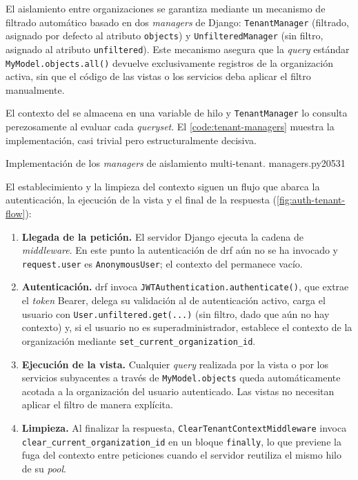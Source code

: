 El aislamiento entre organizaciones se garantiza mediante un mecanismo
de filtrado automático basado en dos \textit{managers} de Django:
\texttt{TenantManager} (filtrado, asignado por defecto al atributo
\texttt{objects}) y \texttt{UnfilteredManager} (sin filtro, asignado al
atributo \texttt{unfiltered}). Este mecanismo asegura que la
\textit{query} estándar \texttt{MyModel.objects.all()} devuelve
exclusivamente registros de la organización activa, sin que el código
de las vistas o los servicios deba aplicar el filtro manualmente.

El contexto del  se almacena en una variable de hilo y
\texttt{TenantManager} lo consulta perezosamente al evaluar cada
\textit{queryset}. El \cref{code:tenant-managers} muestra la
implementación, casi trivial pero estructuralmente decisiva.

%
           {Implementación de los \textit{managers} de aislamiento
            multi-tenant.}%
           {managers.py}{20}{53}{1}

El establecimiento y la limpieza del contexto siguen un flujo que abarca
la autenticación, la ejecución de la vista y el final de la respuesta
(\cref{fig:auth-tenant-flow}):

\begin{enumerate}
  \item \textbf{Llegada de la petición.} El servidor Django ejecuta la
  cadena de \textit{middleware}. En este punto la autenticación de
  \acs{drf} aún no se ha invocado y \texttt{request.user} es
  \texttt{AnonymousUser}; el contexto del  permanece vacío.

  \item \textbf{Autenticación.} \acs{drf} invoca
  \texttt{JWTAuthentication.authenticate()}, que extrae el \textit{token}
  Bearer, delega su validación al  de autenticación activo,
  carga el usuario con \texttt{User.unfiltered.get(...)} (sin filtro,
  dado que aún no hay contexto) y, si el usuario no es
  superadministrador, establece el contexto de la organización mediante
  \texttt{set\_current\_organization\_id}.

  \item \textbf{Ejecución de la vista.} Cualquier \textit{query}
  realizada por la vista o por los servicios subyacentes a través de
  \texttt{MyModel.objects} queda automáticamente acotada a la
  organización del usuario autenticado. Las vistas no necesitan aplicar
  el filtro de manera explícita.

  \item \textbf{Limpieza.} Al finalizar la respuesta,
  \texttt{ClearTenantContextMiddleware} invoca
  \texttt{clear\_current\_organization\_id} en un bloque
  \texttt{finally}, lo que previene la fuga del contexto entre
  peticiones cuando el servidor reutiliza el mismo hilo de su
  \textit{pool}.
\end{enumerate}

